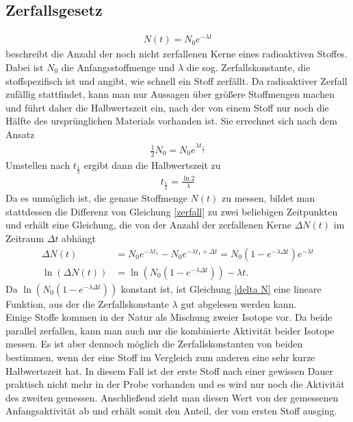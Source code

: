 	\subsection{Zerfallsgesetz}
	\label{zerfallsgesetz}
\begin{align}
	N(t)=N_0e^{-\lambda t}
	\label{zerfall}
\end{align}
beschreibt die Anzahl der noch nicht zerfallenen Kerne eines radioaktiven Stoffes. Dabei ist $N_0$ die Anfangsstoffmenge und $\lambda$ die sog. Zerfallskonstante, die stoffspezifisch ist und angibt, wie schnell ein Stoff zerfällt. Da radioaktiver Zerfall zufällig stattfindet, kann man nur Aussagen über größere Stoffmengen machen und führt daher die Halbwertszeit ein, nach der von einem Stoff nur noch die Hälfte des ursprünglichen Materials vorhanden ist. Sie errechnet sich nach dem Ansatz
\begin{align}
	\frac{1}{2}N_0=N_0e^{\lambda t_{\frac{1}{2}}}
\end{align}
Umstellen nach $t_{\frac{1}{2}}$ ergibt dann die Halbwertszeit zu
\begin{align}
	t_{\frac{1}{2}}=\frac{\ln 2}{\lambda}
	\label{halbwertszeit}
\end{align}
Da es unmöglich ist, die genaue Stoffmenge $N(t)$ zu messen, bildet man stattdessen die Differenz von Gleichung \eqref{zerfall} zu zwei beliebigen Zeitpunkten und erhält eine Gleichung, die von der Anzahl der zerfallenen Kerne $\Delta N(t)$ im Zeitraum $\Delta t$ abhängt
\begin{align}
	\Delta N(t) &= N_0 e^{-\lambda t_1}-N_0 e^{-\lambda t_1+\Delta t} = N_0 (1-e^{-\lambda \Delta t}) e^{-\lambda t}\\
	\ln (\Delta N(t)) &= \ln (N_0 (1-e^{-\lambda \Delta t})) -\lambda t.
	\label{delta N}
\end{align}
Da $\ln (N_0 (1-e^{-\lambda \Delta t}))$ konstant ist, ist Gleichung \eqref{delta N} eine lineare Funktion, aus der die Zerfallskonstante $\lambda$ gut abgelesen werden kann.\\
Einige Stoffe kommen in der Natur als Mischung zweier Isotope vor. Da beide parallel zerfallen, kann man auch nur die kombinierte Aktivität beider Isotope messen.
Es ist aber dennoch möglich die Zerfallskonstanten von beiden bestimmen, wenn der eine Stoff im Vergleich zum anderen eine sehr kurze Halbwertszeit hat. In diesem Fall ist der erste Stoff nach einer gewissen Dauer praktisch nicht mehr in der Probe vorhanden und es wird nur noch die Aktivität des zweiten gemessen.
Anschließend zieht man diesen Wert von der gemessenen Anfangsaktivität ab und erhält somit den Anteil, der vom ersten Stoff ausging.

